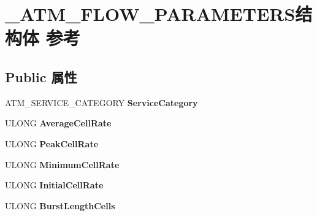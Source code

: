 \hypertarget{struct___a_t_m___f_l_o_w___p_a_r_a_m_e_t_e_r_s}{}\section{\+\_\+\+A\+T\+M\+\_\+\+F\+L\+O\+W\+\_\+\+P\+A\+R\+A\+M\+E\+T\+E\+R\+S结构体 参考}
\label{struct___a_t_m___f_l_o_w___p_a_r_a_m_e_t_e_r_s}
\subsection*{Public 属性}
\begin{DoxyCompactItemize}
\item 
\mbox{\label{struct___a_t_m___f_l_o_w___p_a_r_a_m_e_t_e_r_s_a39ea6d662be9eeeeaa9fd24a225a43e0}} 
A\+T\+M\+\_\+\+S\+E\+R\+V\+I\+C\+E\+\_\+\+C\+A\+T\+E\+G\+O\+RY {\bfseries Service\+Category}
\item 
\mbox{\label{struct___a_t_m___f_l_o_w___p_a_r_a_m_e_t_e_r_s_acf69d8cd37f6f781bb1c0972a5c33843}} 
U\+L\+O\+NG {\bfseries Average\+Cell\+Rate}
\item 
\mbox{\label{struct___a_t_m___f_l_o_w___p_a_r_a_m_e_t_e_r_s_a1d421e4f30543803d7a1c2630128bb07}} 
U\+L\+O\+NG {\bfseries Peak\+Cell\+Rate}
\item 
\mbox{\label{struct___a_t_m___f_l_o_w___p_a_r_a_m_e_t_e_r_s_a3195ba6b05857eeee5d840c7a15b70d0}} 
U\+L\+O\+NG {\bfseries Minimum\+Cell\+Rate}
\item 
\mbox{\label{struct___a_t_m___f_l_o_w___p_a_r_a_m_e_t_e_r_s_aef7be9dd8303bef5806d2b52e64f9381}} 
U\+L\+O\+NG {\bfseries Initial\+Cell\+Rate}
\item 
\mbox{\label{struct___a_t_m___f_l_o_w___p_a_r_a_m_e_t_e_r_s_aa39fb02a59db4c3d5d4b37b8941ae95c}} 
U\+L\+O\+NG {\bfseries Burst\+Length\+Cells}
\item 
\mbox{\label{struct___a_t_m___f_l_o_w___p_a_r_a_m_e_t_e_r_s_a32d2227dfdc3e731b93e2fb22bf40607}} 

\end{DoxyCompactItemize}

